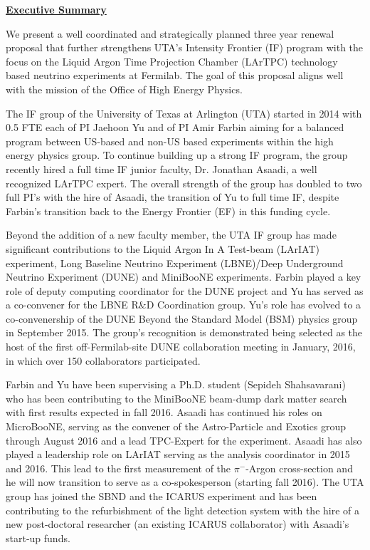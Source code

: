 
\begin{center}
\textbf{\Large\underline{Executive Summary} }
\end{center}

We present a well coordinated and strategically planned three year renewal proposal that further strengthens UTA's Intensity Frontier (IF) program with the focus on the Liquid Argon Time Projection Chamber (LArTPC) technology based neutrino experiments at Fermilab.  The goal of this proposal aligns well with the mission of the Office of High Energy Physics. 

The IF group of the University of Texas at Arlington (UTA) started in 2014 with 0.5 FTE each of PI Jaehoon Yu and of PI Amir Farbin aiming for a balanced program between US-based and non-US based experiments within the high energy physics group. To continue building up a strong IF program, the group recently hired a full time IF junior faculty, Dr. Jonathan Asaadi, a well recognized LArTPC expert. The overall strength of the group has doubled to two full PI's with the hire of Asaadi, the transition of Yu to full time IF, despite Farbin's transition back to the Energy Frontier (EF) in this funding cycle.

Beyond the addition of a new faculty member, the UTA IF group has made significant contributions to the Liquid Argon In A Test-beam (LArIAT) experiment, Long Baseline Neutrino Experiment (LBNE)/Deep Underground Neutrino Experiment (DUNE) and MiniBooNE experiments. Farbin played a key role of deputy computing coordinator for the DUNE project and Yu has served as a co-convener for the LBNE R$\&$D Coordination group. Yu's role has evolved to a co-convenership of the DUNE Beyond the Standard Model (BSM) physics group in September 2015. The group's recognition is demonstrated being selected as the host of the first off-Fermilab-site DUNE collaboration meeting in January, 2016, in which over 150 collaborators participated. 

Farbin and Yu have been supervising a Ph.D. student (Sepideh Shahsavarani) who has been contributing to the MiniBooNE beam-dump dark matter search with first results expected in fall 2016. Asaadi has continued his roles on MicroBooNE, serving as the convener of the Astro-Particle and Exotics group through August 2016 and a lead TPC-Expert for the experiment. Asaadi has also played a leadership role on LArIAT serving as the analysis coordinator in 2015 and 2016. This lead to the first measurement of the $\pi^{-}$-Argon cross-section and he will now transition to serve as a co-spokesperson (starting fall 2016). The UTA group has joined the SBND and the ICARUS experiment and has been contributing to the refurbishment of the light detection system with the hire of a new post-doctoral researcher (an existing ICARUS collaborator) with Asaadi's start-up funds.

